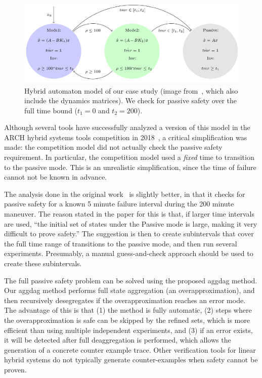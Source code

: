 \begin{figure}[t]
\centerline{\includegraphics[width=0.9\columnwidth]{images/ha.png}}
\caption{Hybrid automaton model of our case study (image from~\cite{chan2017verifying}, which also include the dynamics matrices). We check for passive safety over the full time bound ($t_1=0$ and $t_2=200$).}
\label{fig:ha}
\end{figure}

Although several tools have successfully analyzed a version of this model in the ARCH hybrid systems tools competition in 2018~\cite{archcomp18linear}, a critical simplification was made: the competition model did not actually check the passive safety requirement. In particular, the competition model used a \emph{fixed} time to transition to the passive mode. This is an unrealistic simplification, since the time of failure cannot not be known in advance. 

The analysis done in the original work~\cite{chan2017verifying} is slightly better, in that it checks for passive safety for a known 5 minute failure interval during the 200 minute maneuver. The reason stated in the paper for this is that, if larger time intervals are used,
``the initial set of states under the Passive mode is large, making it very difficult to prove safety.'' The suggestion is then to create subintervals that cover the full time range of transitions to the passive mode, and then run several experiments. Presumably, a manual guess-and-check approach should be used to create these subintervals.

The full passive safety problem can be solved using the proposed aggdag method. Our aggdag method performs full state aggregation (an overapproximation), and then recursively desegregates if the overapproximation reaches an error mode. The advantage of this is that (1) the method is fully automatic, (2) steps where the overapproximation is safe can be skipped by the refined sets, which is more efficient than using multiple independent experiments, and (3) if an error exists, it will be detected after full deaggregation is performed, which allows the generation of a concrete counter example trace. Other verification tools for linear hybrid systems do not typically generate counter-examples when safety cannot be proven.

